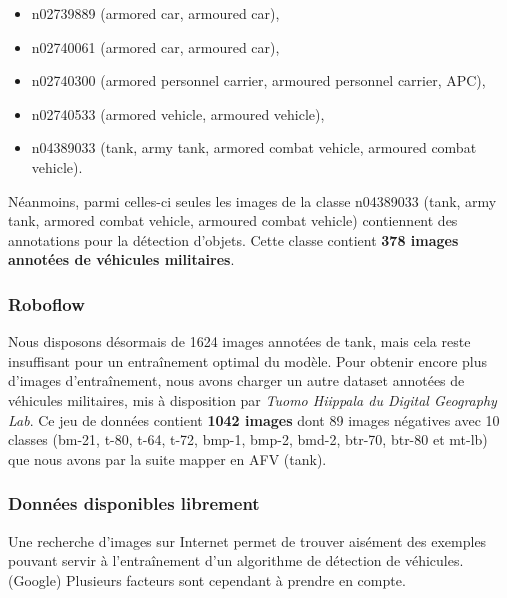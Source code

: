 \begin{itemize}
    \item n02739889 (armored car, armoured car),
    \item n02740061 (armored car, armoured car),
    \item n02740300 (armored personnel carrier, armoured personnel carrier, APC),
    \item n02740533 (armored vehicle, armoured vehicle),
    \item n04389033 (tank, army tank, armored combat vehicle, armoured combat vehicle).
\end{itemize}

Néanmoins, parmi celles-ci seules les images de la classe n04389033 (tank, army tank, armored combat vehicle, armoured combat vehicle) contiennent des annotations pour la détection d’objets.
Cette classe contient \textbf{378 images annotées de véhicules militaires}.

\subsubsection{Roboflow}

Nous disposons désormais de 1624 images annotées de tank, mais cela reste insuffisant pour un entraînement optimal du modèle. Pour obtenir encore plus d'images d'entraînement, nous avons charger un autre dataset annotées de véhicules militaires, mis à disposition par \textit{Tuomo Hiippala du Digital Geography Lab}.\cite{roboflow2024}
Ce jeu de données contient \textbf{1042 images} dont 89 images négatives avec 10 classes (bm-21, t-80, t-64, t-72, bmp-1, bmp-2, bmd-2, btr-70, btr-80 et mt-lb) que nous avons par la suite mapper en AFV (tank).


\subsubsection{Données disponibles librement}

Une recherche d’images sur Internet permet de trouver aisément des exemples pouvant servir à l’entraînement d’un algorithme de détection de véhicules. (Google)
Plusieurs facteurs sont cependant à prendre en compte.


